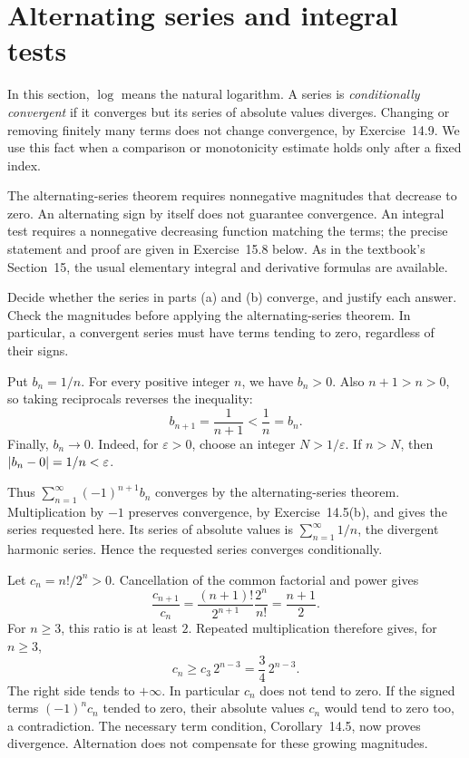 \section{Alternating series and integral tests}
\label{sec:alternating-integral-tests}
In this section, $\log$ means the natural logarithm. A series is
\emph{conditionally convergent} if it converges but its series of
absolute values diverges. Changing or removing finitely many terms
does not change convergence, by Exercise~14.9. We use this fact when
a comparison or monotonicity estimate holds only after a fixed index.

The alternating-series theorem requires nonnegative magnitudes that
decrease to zero. An alternating sign by itself does not guarantee
convergence. An integral test requires a nonnegative decreasing
function matching the terms; the precise statement and proof are
given in Exercise~15.8 below. As in the textbook's Section~15, the
usual elementary integral and derivative formulas are available.

\goal Decide whether the series in parts (a) and (b) converge,
and justify each answer.
\idea Check the magnitudes before applying the alternating-series
theorem. In particular, a convergent series must have terms tending
to zero, regardless of their signs.

Put $b_n=1/n$. For every positive integer $n$, we have $b_n>0$.
Also $n+1>n>0$, so taking reciprocals reverses the inequality:
\[
 b_{n+1}=\frac{1}{n+1}<\frac1n=b_n.
\]
Finally, $b_n\to0$. Indeed, for $\varepsilon>0$, choose an integer
$N>1/\varepsilon$. If $n>N$, then
$\left|b_n-0\right|=1/n<\varepsilon$.

Thus $\sum_{n=1}^{\infty}(-1)^{n+1}b_n$ converges by the
alternating-series theorem. Multiplication by $-1$ preserves
convergence, by Exercise~14.5(b), and gives the series requested here.
Its series of absolute values is $\sum_{n=1}^{\infty}1/n$, the
divergent harmonic series. Hence the requested series converges
conditionally.

Let $c_n=n!/2^n>0$. Cancellation of the common factorial and power
gives
\[
 \frac{c_{n+1}}{c_n}
 =\frac{(n+1)!}{2^{n+1}}\frac{2^n}{n!}
 =\frac{n+1}{2}.
\]
For $n\ge3$, this ratio is at least $2$. Repeated multiplication
therefore gives, for $n\ge3$,
\[
 c_n\ge c_3\,2^{n-3}=\frac34\,2^{n-3}.
\]
The right side tends to $+\infty$. In particular $c_n$ does not
tend to zero. If the signed terms $(-1)^nc_n$ tended to zero, their
absolute values $c_n$ would tend to zero too, a contradiction.
The necessary term condition, Corollary~14.5, now proves divergence.
Alternation does not compensate for these growing magnitudes.

